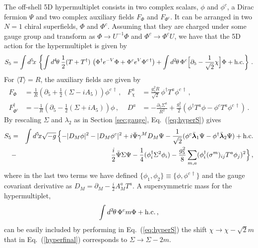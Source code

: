 \documentclass[a4paper,12pt]{article}
\newcommand{\BLambda}{\boldsymbol{\lambda}}
\begin{document}
The off-shell 5D hypermultiplet consists in two complex scalars, $\phi$ and
$\phi^c$,  a Dirac fermion $\Psi$ and two complex
auxiliary fields $F_\Phi$ and 
$F_{\Phi^c}$. It can be arranged in two $N=1$
chiral superfields, $\Phi$ and $\Phi^c$. Assuming that they are charged
under some gauge group and transform as $\Phi\rightarrow U^{-1}\Phi$ and
$\Phi^c\rightarrow \Phi^c U$, we have that the 5D action for the
hypermultiplet is given by
\begin{equation}
    S_5 = \int d^{5}\! x\, \left\{ \int d^4\mspace{-2mu}\theta\: \frac{1}{2}
    (T + T^{\dag} ) \,\left(\Phi^{\dag} e^{-V} \Phi + 
\Phi^{c} e^{V} \Phi^{c\, \dag}\right) + \int
    d^2\mspace{-2mu} \theta\, \Phi^{c} \Bigl[
    \partial_{5}-\frac{1}{\sqrt{2}}\chi\Bigr] \Phi +  
\text{h.c.} \right\}\, .
\label{eq:hyperS}
\end{equation}
For $\langle T\rangle=R$, the auxiliary fields 
are given by
\begin{align}
    F_\Phi & =\frac{1}{R}\left(\partial_{5}+ \frac{1}{2}(\Sigma -
        i A_5) \right)\phi^{c\,\dag}\, ,
      &   F_{\chi}^{a} & = \frac{g^2_5R}{\sqrt{2}} \,\phi^{\dag} T^{a}
        \phi^{c\,\dag}\, ,\nonumber\\
      F_{\Phi^{c}}^{\dag} & = - \frac{1}{R}\left( \partial_{5}-
          \frac{1}{2}(\Sigma + i A_5) \right)\phi\, ,
      \label{eq:relF} &  D^{a} & = -\frac{\partial_{5}\Sigma^a}{R^2} +
      \frac{g_{5}^2}{2}(\phi^{\dag}T^{a}\phi - \phi^{c} T^{a}
      \phi^{c\,\dag})\, .
\end{align}
By rescaling
 $\Sigma$ and $\lambda_2$ as in Section \ref{sec:gauge},
Eq.~(\ref{eq:hyperS}) gives
\begin{eqnarray}
        S_5 &=& \int d^{5}\! x \sqrt{-g} \, \Bigl\{  - | D_{M} \phi
        |^2 - |D_{M} \phi^{c}|^2
        + i \bar{\Psi} \gamma^{M} D_{M} \Psi
               -\frac{1}{\sqrt{2}} 
(\phi^{c} \bar{\BLambda}_{1} \Psi - \phi^{\dag} \bar{\BLambda}_{2} \Psi)
        + \text {h.c.} \nonumber\\
        & -&\frac{i}{2}  \bar{\Psi} \Sigma \Psi - 
\frac{1}{4}(\phi^{\dag}_i \Sigma^2 \phi_i)
        - \frac{g^2_5}{8}
        \sum_{m,a}(\phi_{i}^{\dag} (\sigma^{m})_{ij} T^{a} \phi_{j} )^2
        \Bigr\}\, ,
\label{hyperfinal}
\end{eqnarray}
where in the last two terms we have defined
$\{\phi_1,\phi_2\} \equiv \{\phi,\phi^{c\,\dag}\}$ and the
gauge covariant derivative as
$D_M = \partial_M - \frac{i}{2}  A_M^{a} T^{a}$.
A supersymmetric mass for the hypermultiplet, 
\begin{equation}
\int d^2\mspace{-2mu} \theta\, \Phi^c m \Phi+\text{h.c.}\, ,
\label{susymass}
\end{equation}
can be easily included 
by performing in Eq.~(\ref{eq:hyperS})
the shift 
$\chi\rightarrow \chi-\sqrt{2}m$
that in Eq.~(\ref{hyperfinal}) corresponds to 
$\Sigma\rightarrow \Sigma-2m$.
\end{document}
